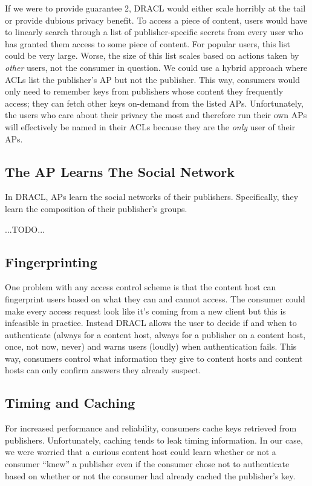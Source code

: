 \documentclass[pdftex,12pt,a4papaer]{report}
\begin{document}
If we were to provide guarantee 2, DRACL would either scale horribly at the tail
or provide dubious privacy benefit. To access a piece of content, users would
have to linearly search through a list of publisher-specific secrets from every user
who has granted them access to some piece of content. For popular users, this
list could be very large. Worse, the size of this list scales based on actions
taken by \emph{other} users, not the consumer in question. We could use a hybrid
approach where ACLs list the publisher's AP but not the publisher. This
way, consumers would only need to remember keys from publishers whose
content they frequently access; they can fetch other keys on-demand from the
listed APs. Unfortunately, the users who care about their privacy the most and
therefore run their own APs will effectively be named in their ACLs because they
are the \emph{only} user of their APs.

\subsection{The AP Learns The Social Network}

In DRACL, APs learn the social networks of their publishers. Specifically,
they learn the composition of their publisher's groups.

...TODO...

\subsection{Fingerprinting}
\label{sub:fingerprinting}

One problem with any access control scheme is that the content host can
fingerprint users based on what they can and cannot access. The consumer could
make every access request look like it's coming from a new client but this is
infeasible in practice. Instead DRACL allows the user to decide if and when to
authenticate (always for a content host, always for a publisher on a content
host, once, not now, never) and warns users (loudly) when authentication fails.
This way, consumers control what information they give to content hosts and
content hosts can only confirm answers they already suspect.

\subsection{Timing and Caching}

For increased performance and reliability, consumers cache keys retrieved from
publishers. Unfortunately, caching tends to leak timing information. In our
case, we were worried that a curious content host could learn whether or not a
consumer ``knew'' a publisher even if the consumer chose not to authenticate
based on whether or not the consumer had already cached the publisher's key.
\end{document}
